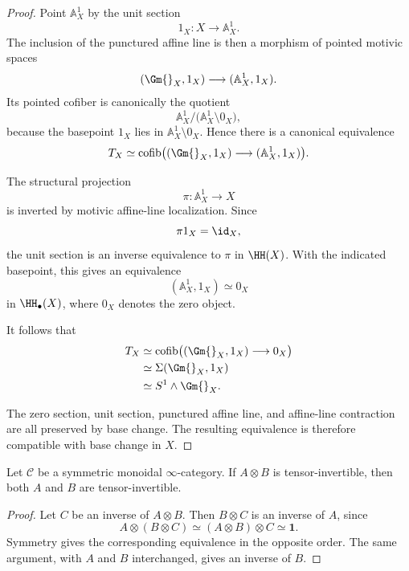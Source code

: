 \begin{proof}
Point \(\mathbb A^1_X\) by the unit section
\[
    1_X:X\longrightarrow\mathbb A^1_X.
\]
The inclusion of the punctured affine line is then a morphism of pointed
motivic spaces
\[
    (\Gm{}_X,1_X)
    \longrightarrow
    (\mathbb A^1_X,1_X).
\]
Its pointed cofiber is canonically the quotient
\[
    \mathbb A^1_X/
    \bigl(\mathbb A^1_X\setminus0_X\bigr),
\]
because the basepoint \(1_X\) lies in
\(\mathbb A^1_X\setminus0_X\).  Hence there is a canonical equivalence
\[
    T_X
    \simeq
    \operatorname{cofib}
    \bigl(
      (\Gm{}_X,1_X)
      \longrightarrow
      (\mathbb A^1_X,1_X)
    \bigr).
\]

The structural projection
\[
    \pi:\mathbb A^1_X\longrightarrow X
\]
is inverted by motivic affine-line localization.  Since
\[
    \pi 1_X=\id_X,
\]
the unit section is an inverse equivalence to \(\pi\) in \(\HH(X)\).
With the indicated basepoint, this gives an equivalence
\[
    (\mathbb A^1_X,1_X)
    \simeq
    0_X
\]
in \(\HH_\bullet(X)\), where \(0_X\) denotes the zero object.

It follows that
\[
\begin{aligned}
    T_X
    &\simeq
    \operatorname{cofib}
    \bigl(
      (\Gm{}_X,1_X)\longrightarrow0_X
    \bigr) \\
    &\simeq
    \Sigma(\Gm{}_X,1_X) \\
    &\simeq
    S^1\wedge\Gm{}_X.
\end{aligned}
\]

The zero section, unit section, punctured affine line, and affine-line
contraction are all preserved by base change.  The resulting equivalence is
therefore compatible with base change in \(X\).
\end{proof}

\begin{lemma}
\label{lem:factors-invertible}
Let $\mathcal C$ be a symmetric monoidal $\infty$-category.  If $A\otimes B$ is tensor-invertible,
then both $A$ and $B$ are tensor-invertible.
\end{lemma}

\begin{proof}
Let $C$ be an inverse of $A\otimes B$.  Then $B\otimes C$ is an inverse of $A$, since
\[
    A\otimes(B\otimes C)
    \simeq
    (A\otimes B)\otimes C
    \simeq
    \mathbf 1.
\]
Symmetry gives the corresponding equivalence in the opposite order.  The same argument, with
$A$ and $B$ interchanged, gives an inverse of $B$.
\end{proof}

